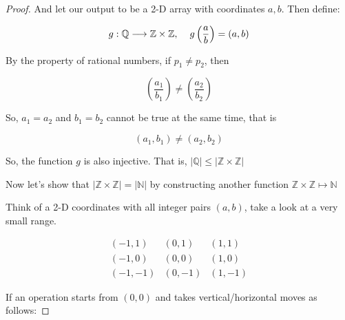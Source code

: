 \documentclass[12pt]{article}
\begin{document}
\begin{proof}
    \vspace*{0.3cm}
    \hspace*{1cm}
    And let our output to be a 2-D array with coordinates $a,b$. Then define:

    \[ g: \mathbb{Q} \longrightarrow \mathbb{Z} \times \mathbb{Z},
    \hspace*{0.4cm} g \left( \frac{a}{b} \right) = (a,b) \]

    \vspace*{0.3cm}
    \hspace*{1cm}
    By the property of rational numbers, if $p_1 \neq p_2$, then

    \[ \left( \frac{a_1}{b_1} \right) \neq \left( \frac{a_2}{b_2} \right) \]

    \vspace*{0.3cm}
    \hspace*{1cm}
    So, $a_1 = a_2$ and $b_1 = b_2$ cannot be true at the same time, that is 

    \[ (a_1,b_1) \neq (a_2,b_2) \]

    \vspace*{0.3cm}
    \hspace*{1cm}
    So, the function $g$ is also injective. That is, $ \vert \mathbb{Q}\vert \leq \vert \mathbb{Z} \times \mathbb{Z} \vert $

    \vspace*{1cm} 
    \hspace*{1cm}
    Now let's show that $\vert \mathbb{Z} \times \mathbb{Z} \vert 
    = \vert \mathbb{N} \vert $
    by constructing another function $ \mathbb{Z} \times \mathbb{Z} 
    \mapsto \mathbb{N} $

    \vspace*{1cm}
    \hspace*{1cm}
    Think of a 2-D coordinates with all integer pairs $(a,b)$,
    take a look at a very small range.

    \[ \begin{matrix}
        (-1,1) & (0,1) & (1,1) \\
        (-1,0) & (0,0) & (1,0) \\
        (-1,-1) & (0,-1) & (1,-1)
    \end{matrix} \]

    \vspace*{0.3cm}
    \hspace*{1cm}
    If an operation starts from $(0,0)$ and takes vertical/horizontal moves
    as follows:


\end{proof}
\end{document}
